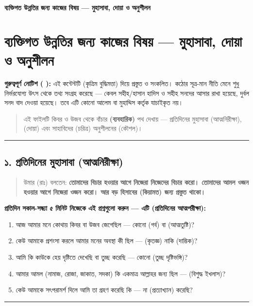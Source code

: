 

\begin{center}{\Large\bfseries\color{emerald} ব্যক্তিগত উন্নতির জন্য কাজের বিষয় — মুহাসাবা, দোয়া ও অনুশীলন}\end{center}
\vspace{1em}
\section*{ব্যক্তিগত উন্নতির জন্য কাজের বিষয় — মুহাসাবা, দোয়া ও অনুশীলন}

\begin{warnbox}
 \textbf{গুরুত্বপূর্ণ নোটিশ ( ):} এই কন্টেন্টটি  (কৃত্রিম বুদ্ধিমত্তা) দিয়ে প্রস্তুত ও সংকলিত।  কঠোর সূত্র-মান নীতি মেনে শুধু নির্ভরযোগ্য উৎস থেকে তথ্য সংগ্রহ করেছে — কেবল সহীহ/হাসান হাদিস ও সহীহ সনদের আসার রাখা হয়েছে, দুর্বল সনদ বাদ দেওয়া হয়েছে। তবে এটি কোনো আলেম বা মুহাদ্দিস কর্তৃক যাচাইকৃত নয়।
\end{warnbox}


\begin{quote}
এই ফাইলটি কিবর ও উজব থেকে বাঁচার \textbf{ (ব্যবহারিক)} পথ দেখায় — প্রতিদিনের মুহাসাবা (আত্মনিরীক্ষা),  (দোয়া) এবং সাহাবিদের  (চরিত্র) অনুশীলনের  (কৌশল)।
\end{quote}

\medskip\hrule\medskip

\subsection*{১. প্রতিদিনের মুহাসাবা (আত্মনিরীক্ষা)}

\begin{quote}
উমার (রাঃ) বলতেন: \textbf{তোমাদের বিচার হওয়ার আগে নিজেরা নিজেদের বিচার করো। তোমাদের আমল ওজন হওয়ার আগে নিজেরা ওজন করো। আর বড় হিসাবের (কিয়ামত) জন্য প্রস্তুত থাকো।}
\end{quote}

\textbf{প্রতিদিন সকাল-সন্ধ্যা ৫ মিনিট নিজেকে এই প্রশ্নগুলো করুন — এটি   (প্রতিদিনের আত্মপরীক্ষা):}

\begin{enumerate}
\item আজ আমার মনে কোথায় কিবর বা উজব জেগেছিল — কোনো  (গর্ব) বা  (আত্মতুষ্টি)?
\item কেউ আমাকে প্রশংসা করলে আমার মনের অবস্থা কী ছিল —  (কৃতজ্ঞ) নাকি  (দাম্ভিক)?
\item আমি কি কাউকে হেয় দৃষ্টিতে দেখেছি বা তুচ্ছ করেছি — কোনো  (তুচ্ছ দৃষ্টিভঙ্গি)?
\item আমার আমল (নামাজ, রোজা, জাকাত, সদকা) কি একমাত্র আল্লাহর জন্য ছিল —   (বিশুদ্ধ ইখলাস)?
\item কেউ আমাকে সৎপরামর্শ দিলে আমি তা গ্রহণ করেছি কি — না  (প্রত্যাখ্যান) করেছি?
\end{enumerate}
\medskip\hrule\medskip

